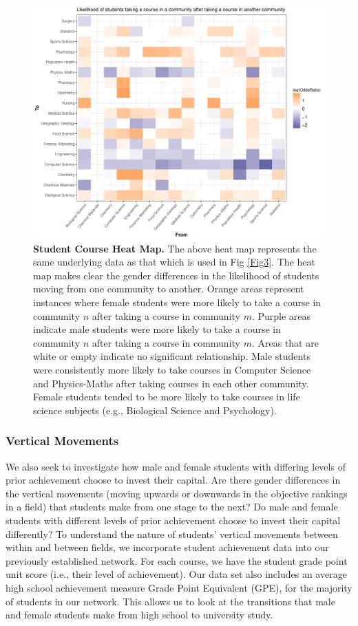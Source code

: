 \begin{figure}[!ht]
\centering
\includegraphics[width = \linewidth]{C3 - Bourdieu Networks/C3 - Fig4.pdf}
\caption{\textbf{Student Course Heat Map.\newline} 
The above heat map represents the same underlying data as that which is used in Fig \ref{Fig3}. The heat map makes clear the gender differences in the likelihood of students moving from one community to another. Orange areas represent instances where female students were more likely to take a course in community $n$ after taking a course in community $m$. Purple areas indicate male students were more likely to take a course in community $n$ after taking a course in community $m$. Areas that are white or empty indicate no significant relationship. Male students were consistently more likely to take courses in Computer Science and Physics-Maths after taking courses in each other community. Female students tended to be more likely to take courses in life science subjects (e.g., Biological Science and Psychology). }
\label{Fig4}
\end{figure}

\subsubsection*{Vertical Movements}
We also seek to investigate how male and female students with differing levels of prior achievement choose to invest their capital. Are there gender differences in the vertical movements (moving upwards or downwards in the objective rankings in a field) that students make from one stage to the next? Do male and female students with different levels of prior achievement choose to invest their capital differently? To understand the nature of students' vertical movements between within and between fields, we incorporate student achievement data into our previously established network. For each course, we have the student grade point unit score (i.e., their level of achievement). Our data set also includes an average high school achievement measure Grade Point Equivalent (GPE), for the majority of students in our network. This allows us to look at the transitions that male and female students make from high school to university study. 

